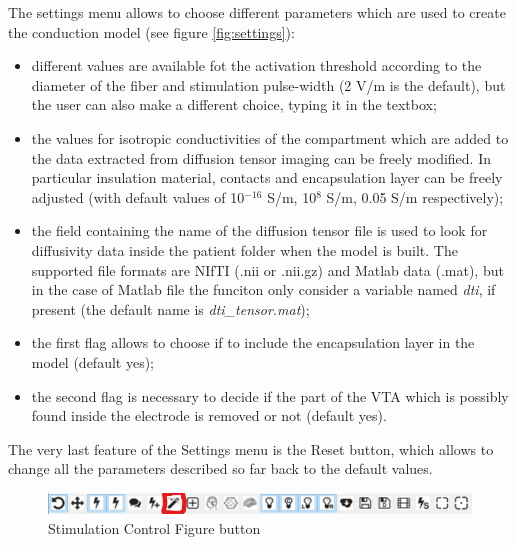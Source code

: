 \documentclass[a4paper,11pt]{article}
\begin{document}
The settings menu allows to choose different parameters which are used to create the conduction model (see figure \ref{fig:settings}):
\begin{itemize}
\item different values are available fot the activation threshold according to the diameter of the fiber and stimulation pulse-width (2 V/m is the default), but the user can also make a different choice, typing it in the textbox;
\item the values for isotropic conductivities of the compartment which are added to the data extracted from diffusion tensor imaging can be freely modified. In particular insulation material, contacts and encapsulation layer can be freely adjusted (with default values of 10$^{-16}$ S/m, 10$^8$ S/m, 0.05 S/m respectively);
\item the field containing the name of the diffusion tensor file is used to look for diffusivity data inside the patient folder when the model is built. The supported file formats are NIfTI (.nii or .nii.gz) and Matlab data (.mat), but in the case of Matlab file the funciton only consider a variable named \emph{dti}, if present (the default name is \emph{dti\_tensor.mat});
\item the first flag allows to choose if to include the encapsulation layer in the model (default yes);
\item the second flag is necessary to decide if the part of the VTA which is possibly found inside the electrode is removed or not (default yes).
\end{itemize}
The very last feature of the Settings menu is the Reset button, which allows to change all the parameters described so far back to the default values.

\begin{figure}
	\includegraphics[width=\linewidth]{images/stim_wand.jpg}
	\caption{Stimulation Control Figure button}
	\label{fig:wand}
\end{figure}
\end{document}
